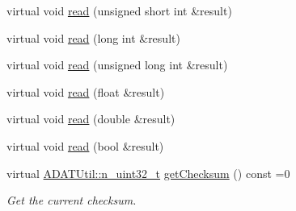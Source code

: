 \begin{DoxyCompactItemize}
\item 
virtual void \mbox{\hyperlink{classADATIO_1_1BinaryReader_a02af26ba1942510d3b9510253945b346}{read}} (unsigned short int \&result)
\item 
virtual void \mbox{\hyperlink{classADATIO_1_1BinaryReader_a5b0788893198274f244f3f04384af660}{read}} (long int \&result)
\item 
virtual void \mbox{\hyperlink{classADATIO_1_1BinaryReader_ae488df4a515666e5516d5a3c30d28f08}{read}} (unsigned long int \&result)
\item 
virtual void \mbox{\hyperlink{classADATIO_1_1BinaryReader_aa9a2094a98b7786a69a9b051b1f5d81a}{read}} (float \&result)
\item 
virtual void \mbox{\hyperlink{classADATIO_1_1BinaryReader_a20d0ff738cbb83d0b266a38c7e5466be}{read}} (double \&result)
\item 
virtual void \mbox{\hyperlink{classADATIO_1_1BinaryReader_a2239e093aff4d32cd3d717a7178d121a}{read}} (bool \&result)
\item 
virtual \mbox{\hyperlink{namespaceADATUtil_ad945a8afa4db2d1f89b731964adae97e}{A\+D\+A\+T\+Util\+::n\+\_\+uint32\+\_\+t}} \mbox{\hyperlink{classADATIO_1_1BinaryReader_acd705bb96d557a5437410b55beb40bda}{get\+Checksum}} () const =0
\begin{DoxyCompactList}\small\item\em Get the current checksum. \end{DoxyCompactList}\end{DoxyCompactItemize}
